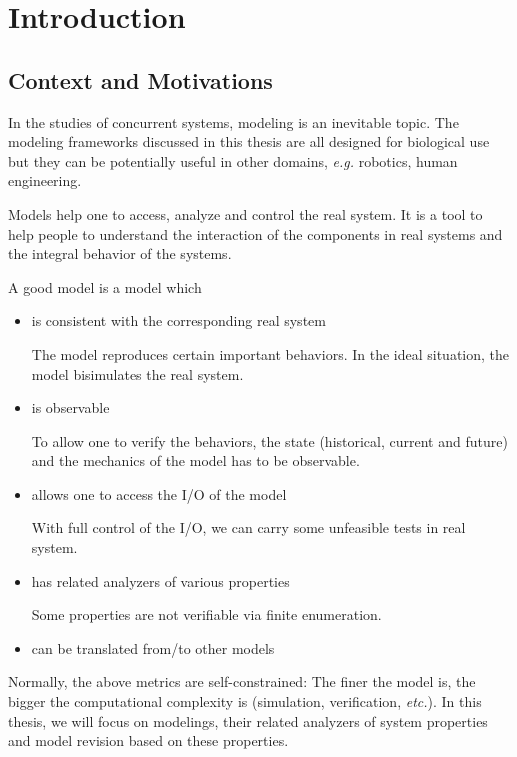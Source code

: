 \chapter{Introduction}\label{chap:intro}
\section{Context and Motivations}
In the studies of concurrent systems, modeling is an inevitable topic.
The modeling frameworks discussed in this thesis are all designed for biological use but they can be potentially useful in other domains, \textit{e.g.} robotics, human engineering.

Models help one to access, analyze and control the real system. 
It is a tool to help people to understand the interaction of the components in real systems and the integral behavior of the systems.

A good model is a model which

\begin{itemize}
    \item is consistent with the corresponding real system
    
    The model reproduces certain important behaviors.
    In the ideal situation, the model bisimulates the real system.
    \item is observable
    
    To allow one to verify the behaviors, the state (historical, current and future) and the mechanics of the model has to be observable.
    
    \item allows one to access the I/O of the model
    
    With full control of the I/O, we can carry some unfeasible tests in real system.
    \item has related analyzers of various properties
    
    Some properties are not verifiable via finite enumeration.
    \item can be translated from/to other models 
\end{itemize}

Normally, the above metrics are self-constrained:
The finer the model is, the bigger the computational complexity is (simulation, verification, \textit{etc.}).
In this thesis, we will focus on modelings, their related analyzers of system properties and model revision based on these properties.

